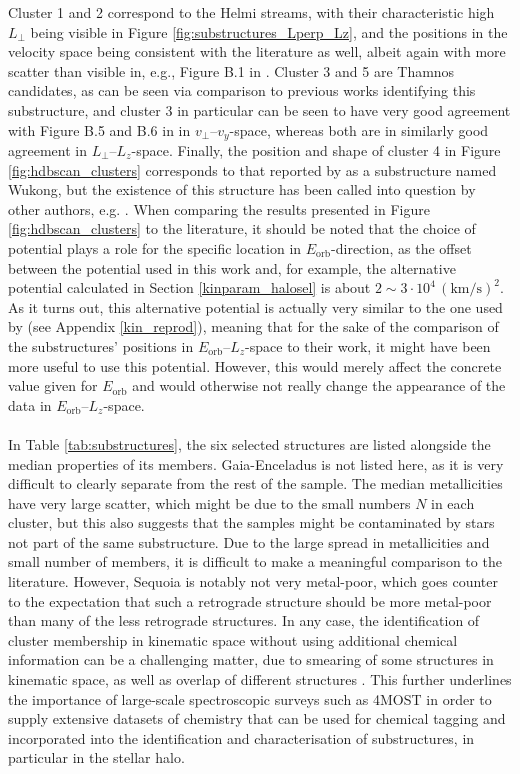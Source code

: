\documentclass[a4paper,11pt]{article}
\begin{document}
Cluster 1 and 2 correspond to the Helmi streams, with their characteristic high $L_\perp$ being visible in Figure \ref{fig:substructures_Lperp_Lz}, and the positions in the velocity space being consistent with the literature as well, albeit again with more scatter than visible in, e.g., Figure B.1 in \citet{ruizlara22}. Cluster 3 and 5 are Thamnos candidates, as can be seen via comparison to previous works identifying this substructure, and cluster 3 in particular can be seen to have very good agreement with Figure B.5 and B.6 in \citet{ruizlara22} in $v_\perp$--$v_y$-space, whereas both are in similarly good agreement in $L_\perp$--$L_z$-space. Finally, the position and shape of cluster 4 in Figure \ref{fig:hdbscan_clusters} corresponds to that reported by \citet{naidu20} as a substructure named Wukong, but the existence of this structure has been called into question by other authors, e.g. \citet{ruizlara22}. When comparing the results presented in Figure \ref{fig:hdbscan_clusters} to the literature, it should be noted that the choice of potential plays a role for the specific location in $E_\mathrm{orb}$-direction, as the offset between the \citet{mcmillan17} potential used in this work and, for example, the alternative potential calculated in Section \ref{kinparam_halosel} is about $2{\sim}3\cdot10^4\,\mathrm{(km/s)}^2$. As it turns out, this alternative potential is actually very similar to the one used by \citet{ruizlara22} (see Appendix \ref{kin_reprod}), meaning that for the sake of the comparison of the substructures' positions in $E_\mathrm{orb}$--$L_z$-space to their work, it might have been more useful to use this potential. However, this would merely affect the concrete value given for $E_\mathrm{orb}$ and would otherwise not really change the appearance of the data in $E_\mathrm{orb}$--$L_z$-space.\\ \\
%
In Table \ref{tab:substructures}, the six selected structures are listed alongside the median properties of its members. Gaia-Enceladus is not listed here, as it is very difficult to clearly separate from the rest of the sample. The median metallicities have very large scatter, which might be due to the small numbers $N$ in each cluster, but this also suggests that the samples might be contaminated by stars not part of the same substructure. Due to the large spread in metallicities and small number of members, it is difficult to make a meaningful comparison to the literature. However, Sequoia is notably not very metal-poor, which goes counter to the expectation that such a retrograde structure should be more metal-poor than many of the less retrograde structures. In any case, the identification of cluster membership in kinematic space without using additional chemical information can be a challenging matter, due to smearing of some structures in kinematic space, as well as overlap of different structures \citep[e.g.,][]{naidu20,koppelman19a}. This further underlines the importance of large-scale spectroscopic surveys such as 4MOST in order to supply extensive datasets of chemistry that can be used for chemical tagging and incorporated into the identification and characterisation of substructures, in particular in the stellar halo.
\end{document}
